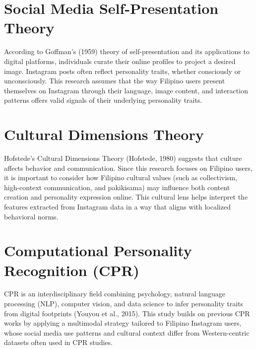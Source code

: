 \section{Social Media Self-Presentation Theory}
According to Goffman’s (1959) theory of self-presentation and its applications to digital platforms, individuals curate their online profiles to project a desired image. Instagram posts often reflect personality traits, whether consciously or unconsciously. This research assumes that the way Filipino users present themselves on Instagram through their language, image content, and interaction patterns offers valid signals of their underlying personality traits.

\section{Cultural Dimensions Theory}
Hofstede’s Cultural Dimensions Theory (Hofstede, 1980) suggests that culture affects behavior and communication. Since this research focuses on Filipino users, it is important to consider how Filipino cultural values (such as collectivism, high-context communication, and pakikisama) may influence both content creation and personality expression online. This cultural lens helps interpret the features extracted from Instagram data in a way that aligns with localized behavioral norms.

\section{Computational Personality Recognition (CPR)}
CPR is an interdisciplinary field combining psychology, natural language processing (NLP), computer vision, and data science to infer personality traits from digital footprints (Youyou et al., 2015). This study builds on previous CPR works by applying a multimodal strategy tailored to Filipino Instagram users, whose social media use patterns and cultural context differ from Western-centric datasets often used in CPR studies.